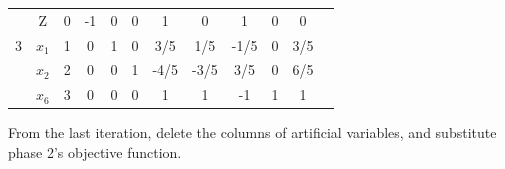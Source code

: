\documentclass[12pt]{article}
\begin{document}
\begin{center}
\begin{tabular}{|c|c|c|c|cccccc|c|c|}
\hline
       &  Z                 &   0  &  -1  &           0  &           0  &  1                 &      0  &                 1  &      0  &    0  &                \\
    3  &  $x_1$             &   1  &   0  &           1  &           0  &  3/5               &    1/5  &              -1/5  &      0  &  3/5  &                \\
       &  $x_2$             &   2  &   0  &           0  &           1  &  -4/5              &   -3/5  &               3/5  &      0  &  6/5  &                \\
       &  $x_6$             &   3  &   0  &           0  &           0  &  1                 &      1  &                -1  &      1  &    1  &                \\
\hline
\end{tabular}
\end{center}



From the last iteration, delete the columns of artificial variables, and substitute phase 2's objective function. 
\end{document}
